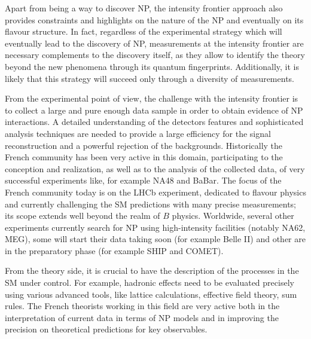 Apart from being a way to discover NP, the intensity frontier approach  also provides constraints and highlights on the nature of the NP and eventually on its flavour structure. 
In fact, regardless of the experimental strategy which will eventually lead to the discovery of NP, measurements at the intensity frontier are necessary complements to the discovery itself, as they allow to  identify the theory beyond the new phenomena  through its quantum fingerprints. Additionally, it is likely that this strategy will succeed only through a diversity of measurements.

From the experimental point of view, the challenge with the intensity frontier is to collect a large and pure enough data sample in order to obtain evidence of NP interactions. A detailed understanding of the detectors features and sophisticated analysis techniques are needed to provide a large efficiency for the signal reconstruction and a powerful rejection of the backgrounds.  Historically the French community has been very active in this domain, participating to the conception and realization, as well as to the analysis of the collected data, of very successful experiments like, for example NA48 and BaBar.  The focus of the French community today is on the  LHCb experiment, dedicated to flavour physics and currently challenging the SM predictions with many precise measurements; its scope extends well beyond the realm of $B$ physics. Worldwide, several other experiments currently search for NP using high-intensity facilities (notably NA62, MEG), some will start their data taking soon (for example Belle II) and other are in the preparatory phase (for example SHIP and COMET). 

From the theory side, it is crucial to have the description of the processes in the SM under control. For example, hadronic effects need to be evaluated precisely using various advanced tools, like lattice calculations, effective field theory, sum rules.  
The French theorists working in this field are very active both in the interpretation of current data in terms of NP models and in improving the precision on theoretical  predictions for key observables. 

